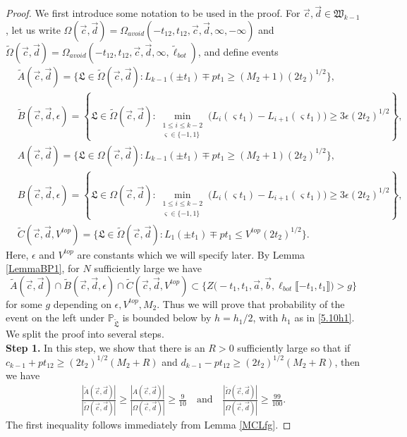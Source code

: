 \begin{proof} We first introduce some notation to be used in the proof. For $\vec{c}, \vec{d} \in \mathfrak{W}_{k-1}$, let us write $\Omega(\vec{c},\vec{d}) = \Omega_{avoid}(-t_{12}, t_{12}, \vec{c}, \vec{d}, \infty, -\infty)$ and $\tilde{\Omega}(\vec{c},\vec{d}) = \Omega_{avoid}(-t_{12}, t_{12}, \vec{c}, \vec{d}, \infty, \tilde{\ell}_{bot})$, and define events
	\begin{equation}
	\begin{split}
	&\tilde A(\vec{c}, \vec{d}) = \{\mathfrak{L} \in \tilde{\Omega}(\vec{c},\vec{d}): L_{k-1}(\pm t_{1}) \mp pt_1 \geq (M_2 + 1) (2t_2)^{1/2} \}, \\
	&\tilde B(\vec{c}, \vec{d}, \epsilon) = \left\{ \mathfrak{L} \in \tilde{\Omega}(\vec{c},\vec{d}): \min_{\substack {1\leq i\leq k-2 \\ \varsigma \in \{-1, 1\}} } \big(L_{i}(\varsigma t_1) - L_{i+1}(\varsigma t_1)\big) \geq 3\epsilon (2t_2)^{1/2} \right\}, \\
	&A(\vec{c}, \vec{d}) = \{ \mathfrak{L} \in \Omega(\vec{c},\vec{d}): L_{k-1}(\pm t_{1}) \mp pt_1 \geq (M_2 + 1) (2t_2)^{1/2} \}, \\
	&B(\vec{c}, \vec{d}, \epsilon) = \left\{ \mathfrak{L} \in \Omega(\vec{c},\vec{d}): \min_{\substack {1\leq i\leq k-2 \\ \varsigma \in \{-1, 1\}} } \big(L_{i}(\varsigma t_1) - L_{i+1}(\varsigma t_1)\big) \geq 3\epsilon (2t_2)^{1/2} \right\},\\
	& \tilde{C}(\vec{c},\vec{d},V^{top}) = \{ \mathfrak{L} \in \tilde{\Omega}(\vec{c},\vec{d}): L_{1}(\pm t_{1}) \mp pt_1 \leq V^{top} (2t_2)^{1/2} \}.
	\end{split}
	\end{equation}
	Here, $\epsilon$ and $V^{top}$ are constants which we will specify later. By Lemma \ref{LemmaBP1}, for $N$ sufficiently large we have $$\tilde A(\vec{c}, \vec{d}) \cap \tilde B(\vec{c}, \vec{d}, \epsilon) \cap \tilde{C}(\vec{c},\vec{d},V^{top}) \subset \big\{Z\big(  -t_1, t_1, \vec{a} ,\vec{b}, \ell_{bot}\llbracket -t_1, t_1\rrbracket\big) > g\big\}$$
	for some $g$ depending on $\epsilon,V^{top},M_2$. Thus we will prove that probability of the event on the left under $\mathbb{P}_{\tilde{\mathfrak L}}$ is bounded below by $h = h_1/2$, with $h_1$ as in \eqref{5.10h1}. We split the proof into several steps.\\
	
	{\bf \raggedleft Step 1.} In this step, we show that there is an $R > 0$ sufficiently large so that if $c_{k-1} + pt_{12} \geq (2t_2)^{1/2} (M_2 + R)$ and $d_{k-1} - pt_{12} \geq (2t_2)^{1/2} (M_2 + R)$, then we have 
	\begin{equation}\label{5.8step1}
	\begin{split}
	\frac{|\tilde A(\vec{c}, \vec{d})|}{|\tilde{\Omega}(\vec{c}, \vec{d})|} \geq \frac{| A(\vec{c}, \vec{d})|}{|{\Omega}(\vec{c}, \vec{d})|} \geq  \frac{9}{10} \quad \mathrm{and} \quad \frac{|\tilde{\Omega}(\vec{c}, \vec{d})|}{|{\Omega}(\vec{c}, \vec{d})|} \geq \frac{99}{100}.
	\end{split}
	\end{equation} 
	The first inequality follows immediately from Lemma \ref{MCLfg}. 
	

\end{proof}
